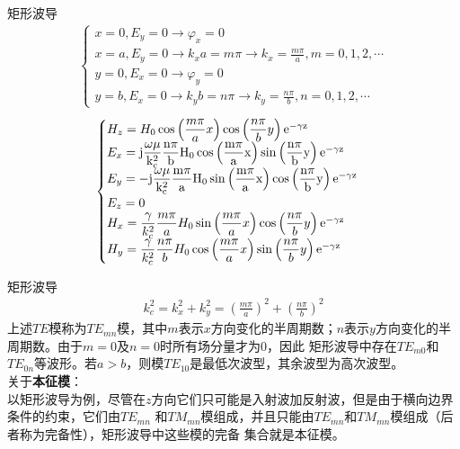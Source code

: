 \begin{frame}{矩形波导}
    \begin{align*}
        \begin{cases}
            x=0,E_y=0 \rightarrow \varphi_x=0                                    \\
            x=a,E_y=0 \rightarrow k_x a=m\pi \rightarrow k_x=\frac{m\pi}{a},m=0,1,2,\cdots \\
            y=0,E_x=0 \rightarrow \varphi_y=0                                    \\
            y=b,E_x=0 \rightarrow k_y b=n\pi \rightarrow k_y=\frac{n\pi}{b},n=0,1,2,\cdots
        \end{cases}
    \end{align*}
    \begin{align}
        \begin{cases}
            H_z=H_0\cos\left(\dfrac{m\pi}{a}x\right)\cos\left(\dfrac{n\pi}{b}y\right)\rm{e}^{-\gamma z}                                             \\
            E_x=\rm{j}\dfrac{\omega\mu}{k_c^2}\dfrac{n\pi}{b}H_0\cos\left(\dfrac{m\pi}{a}x\right)\sin\left(\dfrac{n\pi}{b}y\right)\rm{e}^{-\gamma z}  \\
            E_y=-\rm{j}\dfrac{\omega\mu}{k_c^2}\dfrac{m\pi}{a}H_0\sin\left(\dfrac{m\pi}{a}x\right)\cos\left(\dfrac{n\pi}{b}y\right)\rm{e}^{-\gamma z} \\
            E_z=0                                                                                                           \\
            H_x=\dfrac{\gamma}{k_c^2}\dfrac{m\pi}{a}H_0\sin\left(\dfrac{m\pi}{a}x\right)\cos\left(\dfrac{n\pi}{b}y\right)\rm{e}^{-\gamma z}           \\
            H_y=\dfrac{\gamma}{k_c^2}\dfrac{n\pi}{b}H_0\cos\left(\dfrac{m\pi}{a}x\right)\sin\left(\dfrac{n\pi}{b}y\right)\rm{e}^{-\gamma z}
        \end{cases}
    \end{align}
    
\end{frame}

\begin{frame}{矩形波导}
    \begin{align}
        k_c^2=k_x^2+k_y^2=\left(\frac{m\pi}{a}\right)^2+\left(\frac{n\pi}{b}\right)^2
    \end{align}
    上述$TE$模称为$TE_{mn}$模，其中$m$表示$x$方向变化的半周期数；$n$表示$y$方向变化的半周期数。由于$m=0$及$n=0$时所有场分量才为0，因此
    矩形波导中存在$TE_{m0}$和$TE_{0n}$等波形。若$a>b$，则模$TE_{10}$是最低次波型，其余波型为高次波型。\\
    关于\textbf{本征模}：\\
    以矩形波导为例，尽管在$z$方向它们只可能是入射波加反射波，但是由于横向边界条件的约束，它们由$TE_{mn}$
    和$TM_{mn}$模组成，并且只能由$TE_{mn}$和$TM_{mn}$模组成（后者称为完备性），矩形波导中这些模的完备
    集合就是本征模。
\end{frame}

